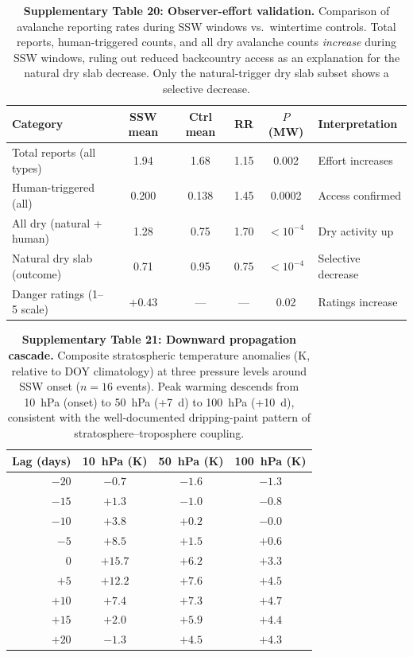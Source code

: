 \documentclass[11pt,letterpaper]{article}
\begin{document}
\begin{table}[!ht]
\centering
\caption{\textbf{Supplementary Table 20: Observer-effort validation.}
Comparison of avalanche reporting rates during SSW windows vs.\ wintertime controls. Total reports, human-triggered counts, and all dry avalanche counts \emph{increase} during SSW windows, ruling out reduced backcountry access as an explanation for the natural dry slab decrease. Only the natural-trigger dry slab subset shows a selective decrease.}
\label{tab:observer}
\small
\begin{tabular}{lccccl}
\toprule
Category & SSW mean & Ctrl mean & RR & $P$ (MW) & Interpretation \\
\midrule
Total reports (all types) & 1.94 & 1.68 & 1.15 & 0.002 & Effort increases \\
Human-triggered (all) & 0.200 & 0.138 & 1.45 & 0.0002 & Access confirmed \\
All dry (natural + human) & 1.28 & 0.75 & 1.70 & $< 10^{-4}$ & Dry activity up \\
Natural dry slab (outcome) & 0.71 & 0.95 & 0.75 & $< 10^{-4}$ & Selective decrease \\
Danger ratings (1--5 scale) & $+0.43$ & --- & --- & 0.02 & Ratings increase \\
\bottomrule
\end{tabular}
\end{table}


\begin{table}[!ht]
\centering
\caption{\textbf{Supplementary Table 21: Downward propagation cascade.}
Composite stratospheric temperature anomalies (K, relative to DOY climatology) at three pressure levels around SSW onset ($n = 16$ events). Peak warming descends from 10~hPa (onset) to 50~hPa (+7~d) to 100~hPa (+10~d), consistent with the well-documented dripping-paint pattern of stratosphere--troposphere coupling.}
\label{tab:propagation_cascade}
\small
\begin{tabular}{rccc}
\toprule
Lag (days) & 10~hPa (K) & 50~hPa (K) & 100~hPa (K) \\
\midrule
$-20$ & $-0.7$ & $-1.6$ & $-1.3$ \\
$-15$ & $+1.3$ & $-1.0$ & $-0.8$ \\
$-10$ & $+3.8$ & $+0.2$ & $-0.0$ \\
$-5$ & $+8.5$ & $+1.5$ & $+0.6$ \\
$0$ & $\mathbf{+15.7}$ & $+6.2$ & $+3.3$ \\
$+5$ & $+12.2$ & $+7.6$ & $+4.5$ \\
$+10$ & $+7.4$ & $+7.3$ & $\mathbf{+4.7}$ \\
$+15$ & $+2.0$ & $+5.9$ & $+4.4$ \\
$+20$ & $-1.3$ & $+4.5$ & $+4.3$ \\
\bottomrule
\end{tabular}
\end{table}
\end{document}
